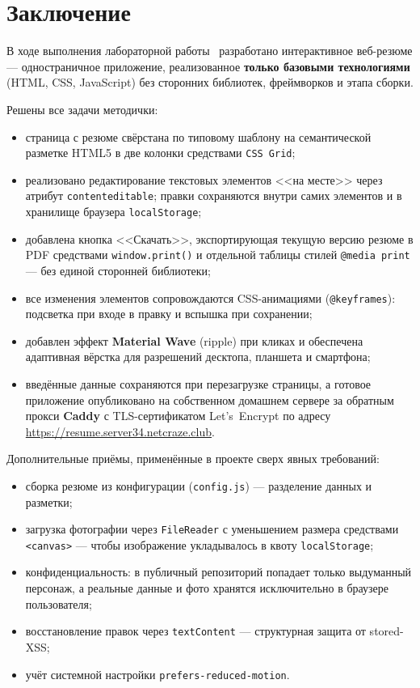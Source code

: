 \chapter*{Заключение}
\label{ch:conclusion}

В ходе выполнения лабораторной работы~\cfgLabNumber{} разработано
интерактивное веб-резюме --- одностраничное приложение, реализованное
\textbf{только базовыми технологиями} (HTML, CSS, JavaScript) без сторонних
библиотек, фреймворков и этапа сборки.

Решены все задачи методички:
\begin{itemize}
  \item страница с резюме свёрстана по типовому шаблону на семантической
        разметке HTML5 в две колонки средствами \texttt{CSS~Grid};
  \item реализовано редактирование текстовых элементов <<на месте>> через
        атрибут \texttt{contenteditable}; правки сохраняются внутри самих
        элементов и в хранилище браузера \texttt{localStorage};
  \item добавлена кнопка <<Скачать>>, экспортирующая текущую версию резюме в
        PDF средствами \texttt{window.print()} и отдельной таблицы стилей
        \texttt{@media~print} --- без единой сторонней библиотеки;
  \item все изменения элементов сопровождаются CSS-анимациями
        (\texttt{@keyframes}): подсветка при входе в правку и вспышка при
        сохранении;
  \item добавлен эффект \textbf{Material Wave} (ripple) при кликах и
        обеспечена адаптивная вёрстка для разрешений десктопа, планшета и
        смартфона;
  \item введённые данные сохраняются при перезагрузке страницы, а готовое
        приложение опубликовано на собственном домашнем сервере за обратным
        прокси \textbf{Caddy} с TLS-сертификатом Let's~Encrypt по адресу
        \url{https://resume.server34.netcraze.club}.
\end{itemize}

Дополнительные приёмы, применённые в проекте сверх явных требований:
\begin{itemize}
  \item сборка резюме из конфигурации (\texttt{config.js}) --- разделение
        данных и разметки;
  \item загрузка фотографии через \texttt{FileReader} с уменьшением размера
        средствами \texttt{<canvas>} --- чтобы изображение укладывалось в
        квоту \texttt{localStorage};
  \item конфиденциальность: в публичный репозиторий попадает только
        выдуманный персонаж, а реальные данные и фото хранятся исключительно
        в браузере пользователя;
  \item восстановление правок через \texttt{textContent} --- структурная
        защита от stored-XSS;
  \item учёт системной настройки \texttt{prefers-reduced-motion}.
\end{itemize}

